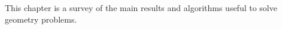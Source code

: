 This chapter is a survey of the main results and algorithms useful to solve geometry problems.

\section{}